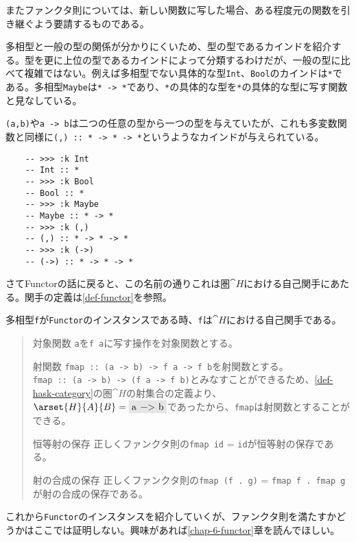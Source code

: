 \documentclass[uplatex,dvipdfmx]{jsarticle}
\newcommand{\pr}[1]{\colorbox[rgb]{0.9,0.9,0.9}{\lstinline{#1}}}
\newcommand{\refcti}[1]{\cite{cti}\ref{#1}}
\begin{document}
  またファンクタ則については、新しい関数に写した場合、ある程度元の関数を引き継ぐよう要請するものである。

  多相型と一般の型の関係が分かりにくいため、型の型であるカインドを紹介する。型を更に上位の型であるカインドによって分類するわけだが、一般の型に比べて複雑ではない。例えば多相型でない具体的な型\pr{Int}、\pr{Bool}のカインドは\pr{*}である。多相型\pr{Maybe}は\pr{* -> *}であり、\pr{*}の具体的な型を\pr{*}の具体的な型に写す関数と見なしている。

  \pr{(a,b)}や\pr{a -> b}は二つの任意の型から一つの型を与えていたが、これも多変数関数と同様に\pr{(,) :: * -> * -> *}というようなカインドが与えられている。

  \begin{lstlisting}
    -- >>> :k Int
    -- Int :: *
    -- >>> :k Bool
    -- Bool :: *
    -- >>> :k Maybe
    -- Maybe :: * -> *
    -- >>> :k (,)
    -- (,) :: * -> * -> *
    -- >>> :k (->)
    -- (->) :: * -> * -> *
  \end{lstlisting}

  さてFunctorの話に戻ると、この名前の通りこれは圏$\cat{H}$における自己関手にあたる。関手の定義は\refcti{def-functor}を参照。
  \begin{prop}\label{prop-functor-is-self-functor}
    多相型\pr{f}が\pr{Functor}のインスタンスである時、\pr{f}は$\cat{H}$における自己関手である。
    \begin{quote}
			\begin{mydescription}
		\item[対象関数] \pr{a}を\pr{f a}に写す操作を対象関数とする。
		\item[射関数] \pr{fmap :: (a -> b) -> f a -> f b}を射関数とする。\\
    \pr{fmap :: (a -> b) -> (f a -> f b)}とみなすことができるため、\ref{def-hask-category}の圏$\cat{H}$の射集合の定義より、$\arset{H}{A}{B}=\pr{a -> b}$であったから、\pr{fmap}は射関数とすることができる。
		\item[恒等射の保存] 正しくファンクタ則の\pr{fmap id} = \pr{id}が恒等射の保存である。
		\item[射の合成の保存] 正しくファンクタ則の\pr{fmap (f . g)} = \pr{fmap f . fmap g}が射の合成の保存である。
		\end{mydescription}
		\end{quote}
  \end{prop}
  これから\pr{Functor}のインスタンスを紹介していくが、ファンクタ則を満たすかどうかはここでは証明しない。興味があれば\refcti{chap-6-functor}章を読んでほしい。
\end{document}
